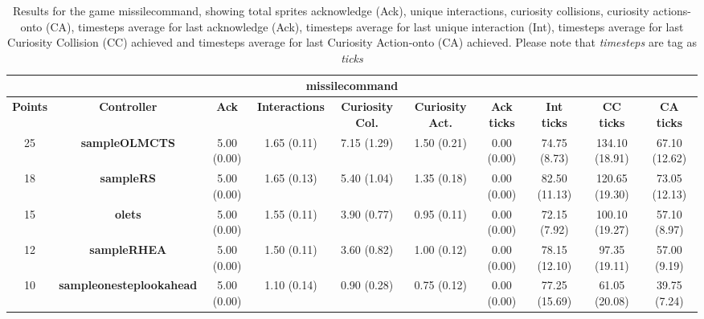 \begin{table*}[!t]
\begin{center}
\begin{adjustbox}{width=1\textwidth}
\begin{tabular}{|c|c|c|c|c|c|c|c|c|c|}
\multicolumn{10}{c}{\textbf{missilecommand}}\\
\hline
\textbf{Points} & \textbf{Controller} & \textbf{Ack} & \textbf{Interactions} & \textbf{Curiosity Col.} & \textbf{Curiosity Act.} & \textbf{Ack ticks} & \textbf{Int ticks} & \textbf{CC ticks} & \textbf{CA ticks}\\
\hline
25 & \textbf{sampleOLMCTS} & 5.00 (0.00) & 1.65 (0.11) & 7.15 (1.29) & 1.50 (0.21) & 0.00 (0.00) & 74.75 (8.73) & 134.10 (18.91) & 67.10 (12.62)
 \\
\hline
18 & \textbf{sampleRS} & 5.00 (0.00) & 1.65 (0.13) & 5.40 (1.04) & 1.35 (0.18) & 0.00 (0.00) & 82.50 (11.13) & 120.65 (19.30) & 73.05 (12.13)
 \\
\hline
15 & \textbf{olets} & 5.00 (0.00) & 1.55 (0.11) & 3.90 (0.77) & 0.95 (0.11) & 0.00 (0.00) & 72.15 (7.92) & 100.10 (19.27) & 57.10 (8.97)
 \\
\hline
12 & \textbf{sampleRHEA} & 5.00 (0.00) & 1.50 (0.11) & 3.60 (0.82) & 1.00 (0.12) & 0.00 (0.00) & 78.15 (12.10) & 97.35 (19.11) & 57.00 (9.19)
 \\
\hline
10 & \textbf{sampleonesteplookahead} & 5.00 (0.00) & 1.10 (0.14) & 0.90 (0.28) & 0.75 (0.12) & 0.00 (0.00) & 77.25 (15.69) & 61.05 (20.08) & 39.75 (7.24)
 \\
\hline
\end{tabular}
\end{adjustbox}
\caption{Results for the game missilecommand, showing total sprites acknowledge (Ack), unique interactions, curiosity collisions, curiosity actions-onto (CA), timesteps average for last acknowledge (Ack),  timesteps average for last unique interaction (Int), timesteps average for last Curiosity Collision (CC) achieved and timesteps average for last Curiosity Action-onto (CA) achieved. Please note that \textit{timesteps} are tag as \textit{ticks}}
\label{tab:weights}
\end{center}
\end{table*}

